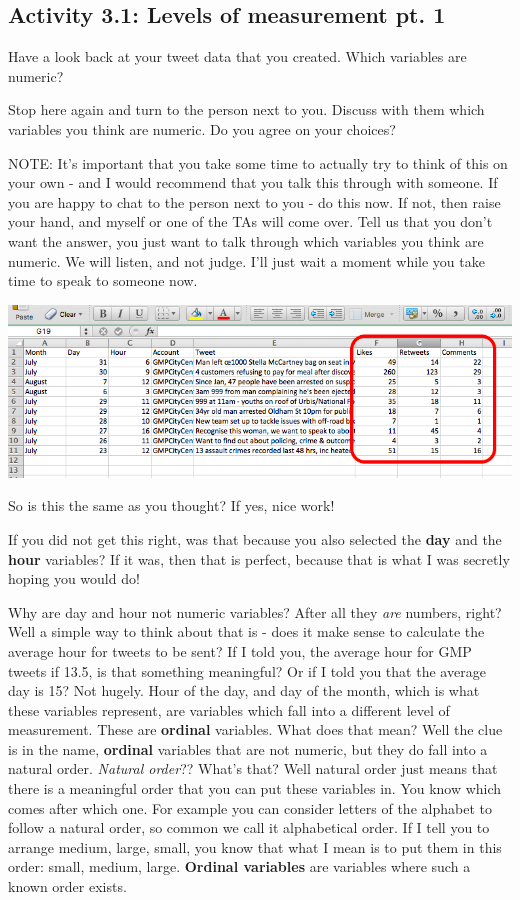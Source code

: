 \documentclass[]{book}
\theoremstyle{definition}
\theoremstyle{definition}
\theoremstyle{definition}
\theoremstyle{remark}
\begin{document}
\hypertarget{activity-3.1-levels-of-measurement-pt.-1}{%
\subsection{Activity 3.1: Levels of measurement pt.
1}\label{activity-3.1-levels-of-measurement-pt.-1}}

 Have a look back at your tweet data that you created. Which variables
are numeric?

Stop here again and turn to the person next to you. Discuss with them
which variables you think are numeric. Do you agree on your choices?

NOTE: It's important that you take some time to actually try to think of
this on your own - and I would recommend that you talk this through with
someone. If you are happy to chat to the person next to you - do this
now. If not, then raise your hand, and myself or one of the TAs will
come over. Tell us that you don't want the answer, you just want to talk
through which variables you think are numeric. We will listen, and not
judge. I'll just wait a moment while you take time to speak to someone
now.

\includegraphics{imgs/num_vars.png}

So is this the same as you thought? If yes, nice work!

If you did not get this right, was that because you also selected the
\textbf{day} and the \textbf{hour} variables? If it was, then that is
perfect, because that is what I was secretly hoping you would do!

Why are day and hour not numeric variables? After all they \emph{are}
numbers, right? Well a simple way to think about that is - does it make
sense to calculate the average hour for tweets to be sent? If I told
you, the average hour for GMP tweets if 13.5, is that something
meaningful? Or if I told you that the average day is 15? Not hugely.
Hour of the day, and day of the month, which is what these variables
represent, are variables which fall into a different level of
measurement. These are \textbf{ordinal} variables. What does that mean?
Well the clue is in the name, \textbf{ordinal} variables that are not
numeric, but they do fall into a natural order. \emph{Natural order}??
What's that? Well natural order just means that there is a meaningful
order that you can put these variables in. You know which comes after
which one. For example you can consider letters of the alphabet to
follow a natural order, so common we call it alphabetical order. If I
tell you to arrange medium, large, small, you know that what I mean is
to put them in this order: small, medium, large. \textbf{Ordinal
variables} are variables where such a known order exists.
\end{document}
